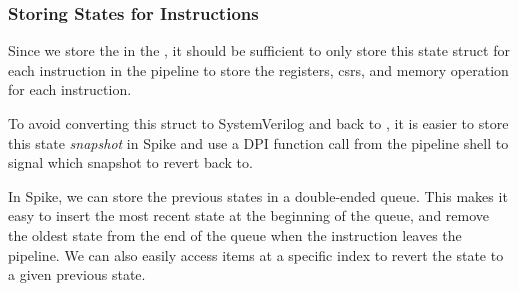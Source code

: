 %
%
%
%
%
%
%

\subsubsection{Storing States for Instructions}

Since we store the  in the , it should be sufficient to only store this state struct for each instruction in the pipeline to store the registers, \acrshort{csr}s, and memory operation for each instruction. 

To avoid converting this struct to SystemVerilog and back to \cpp, it is easier to store this state \textit{snapshot} in Spike and use a DPI function call from the pipeline shell to signal which snapshot to revert back to.

In Spike, we can store the previous states in a  double-ended queue. This makes it easy to insert the most recent state at the beginning of the queue, and remove the oldest state from the end of the queue when the instruction leaves the pipeline. 
We can also easily access items at a specific index to revert the state to a given previous state.

